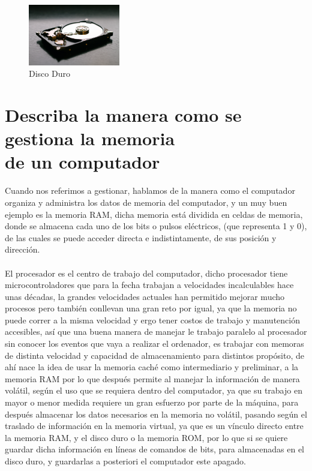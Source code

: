 \documentclass{article}
\begin{document}
	\begin{figure}[h]
		\includegraphics[width=4cm]{rom.jpg}
		\centering
		\caption{Disco Duro}
		\label{rom}
	\end{figure}
	
	\section{Describa la manera como se gestiona la memoria\\de un computador} \label{describa}
	Cuando nos referimos a gestionar, hablamos de la manera como el computador organiza y administra los datos de memoria del computador, y un muy buen ejemplo es la memoria RAM, dicha memoria está dividida en celdas de memoria, donde se almacena cada uno de los bits o pulsos eléctricos, (que representa 1 y 0), de las cuales se puede acceder directa e indistintamente, de sus posición y dirección.
	\\\\
	El procesador es el centro de trabajo del computador, dicho procesador tiene microcontroladores que para la fecha trabajan a velocidades incalculables hace unas décadas, la grandes velocidades actuales han permitido mejorar mucho procesos pero también conllevan una gran reto por igual, ya que la memoria no puede correr a la misma velocidad y ergo tener costos de trabajo y manutención accesibles, así que una buena manera de manejar le trabajo paralelo al procesador sin conocer los eventos que vaya a realizar el ordenador, es trabajar con memoras de distinta velocidad y capacidad de almacenamiento para distintos propósito, de ahí nace la idea de usar la memoria caché como intermediario y preliminar, a la memoria RAM por lo que después permite al manejar la información de manera volátil, según el uso que se requiera dentro del computador, ya que su trabajo en mayor o menor medida requiere un gran esfuerzo por parte de la máquina, para después almacenar los datos necesarios en la memoria no volátil, pasando según el traslado de información en la memoria virtual, ya que es un vínculo directo entre la memoria RAM, y el disco duro o la memoria ROM, por lo que si se quiere guardar dicha información en líneas de comandos de bits, para almacenadas en el disco duro, y guardarlas a posteriori el computador este apagado.
\end{document}
